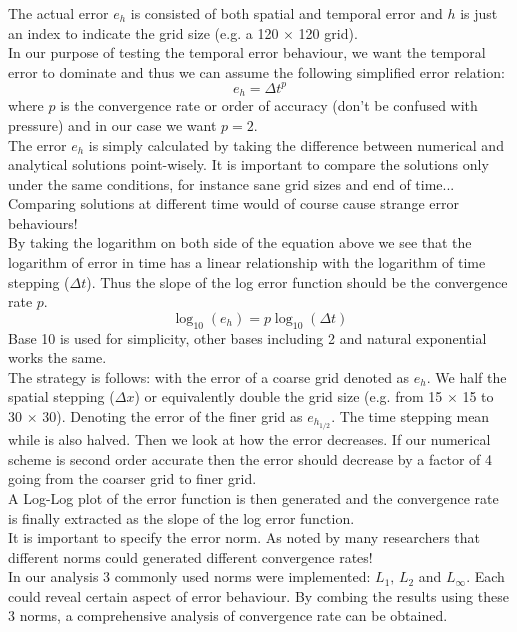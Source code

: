 The actual error $e_h$ is consisted of both spatial and temporal error and $h$ is just an index to indicate the grid size (e.g. a 120 $\times$ 120 grid).\\
In our purpose of testing the temporal error behaviour, we want the temporal error to dominate and thus we can assume the following simplified error relation:
\begin{equation}
e_h = \Delta t^p
\end{equation}
where $p$ is the convergence rate or order of accuracy (don't be confused with pressure) and in our case we want $p=2$.\\

The error $e_h$ is simply calculated by taking the difference between numerical and analytical solutions point-wisely. It is important to compare the solutions only under the same conditions, for instance sane grid sizes and end of time... Comparing solutions at different time would of course cause strange error behaviours!\\

By taking the logarithm on both side of the equation above we see that the logarithm of error in time has a linear relationship with the logarithm of time stepping ($\Delta t$). Thus the slope of the log error function should be the convergence rate $p$.
\begin{equation}
\log_{10} (e_h) = p\log_{10} (\Delta t)
\end{equation}
Base 10 is used for simplicity, other bases including 2 and natural exponential works the same.\\

The strategy is follows: with the error of a coarse grid denoted as $e_h$. We half the spatial stepping ($\Delta x$) or equivalently double the grid size (e.g. from 15 $\times$ 15 to 30 $\times$ 30). Denoting the error of the finer grid as $e_{h_{1/2}}$. The time stepping mean while is also halved. Then we look at how the error decreases. If our numerical scheme is second order accurate then the error should decrease by a factor of 4 going from the coarser grid to finer grid.\\

A Log-Log plot of the error function is then generated and the convergence rate is finally extracted as the slope of the log error function.\\

It is important to specify the error norm. As noted by many researchers that different norms could generated different convergence rates! \cite{pyo2005normal,guermond2004error}\\
In our analysis 3 commonly used norms were implemented: $L_1,\,L_2$ and $L_\infty$. Each could reveal certain aspect of error behaviour. By combing the results using these 3 norms, a comprehensive analysis of convergence rate can be obtained.\\

